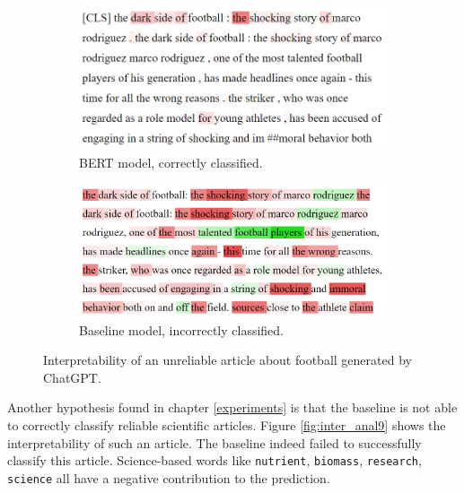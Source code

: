 \begin{figure}[H]
    \centering
    \begin{subfigure}{.5\textwidth}
      \centering
      \includegraphics[width=\linewidth]{obrazky-figures/football_fake.png}
      \caption{BERT model, correctly classified.}
      \label{fig:inter_anal4_a}
    \end{subfigure}%
    \begin{subfigure}{.5\textwidth}
      \centering
      \includegraphics[width=\linewidth]{obrazky-figures/bayes_football2.png}
      \caption{Baseline model, incorrectly classified.}
      \label{fig:inter_anal4_b}
    \end{subfigure}
    \caption{Interpretability of an unreliable article about football generated by ChatGPT.}
    \label{fig:inter_anal4}
\end{figure}
 
Another hypothesis found in chapter \ref{experiments} is that the baseline is not able to correctly classify reliable scientific articles. Figure \ref{fig:inter_anal9} shows the interpretability of such an article. The baseline indeed failed to successfully classify this article. Science-based words like \texttt{nutrient}, \texttt{biomass}, \texttt{research}, \texttt{science} all have a negative contribution to the prediction. 

